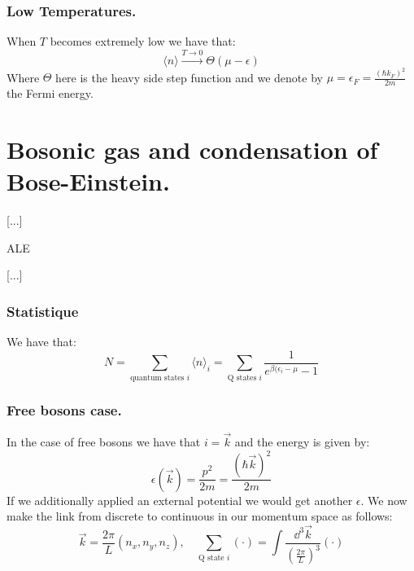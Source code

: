 \documentclass[10pt,a4paper]{book}
\begin{document}
\subsubsection{Low Temperatures.}
When $T$ becomes extremely low we have that: 
\[
\langle n \rangle \stackrel{T \to 0}{\longrightarrow} \Theta(\mu - \epsilon)
\]
Where $\Theta$ here is the heavy side step function and we denote by $\mu = \epsilon_F = \frac{(\hbar k_F)^2}{2m}$ the Fermi energy.

\section{Bosonic gas and condensation of Bose-Einstein.}



[...]

ALE

[...]

\subsubsection{Statistique}
We have that:
\[
N = \sum_{\text{quantum states }i } \langle n \rangle_i = \sum_{\text{Q states } i} \frac{1}{e^{\beta(\epsilon_i - \mu} - 1}
\]

\subsubsection{Free bosons case.}
In the case of free bosons we have that $i = \vec{k}$ and the energy is given by:
\[
\epsilon(\vec{k}) = \frac{p^2}{2m} = \frac{\left (\hbar \vec{k} \right)^2}{2m}
\]
If we additionally applied an external potential we would get another $\epsilon$. We now make the link from discrete to continuous in our momentum space as follows:
\[
\vec{k} = \frac{2\pi}{L} \left(n_x, n_y, n_z\right), \quad \sum_{\text{Q state } i} \left( \cdot \right) = \int \frac{\dd^3 \vec{k}}{\left( \frac{2\pi}{L} \right)^3} \left( \cdot \right)
\]
\end{document}
